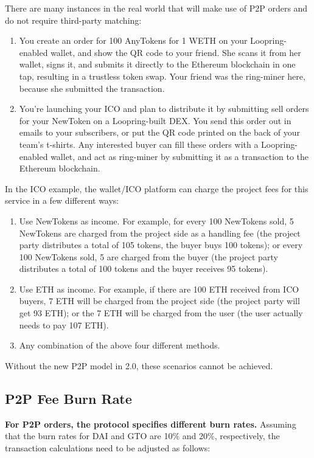 \documentclass[UTF8,nofonts]{article}
\begin{document}
\begin{multicols}{2}
\begin{appendices}
There are many instances in the real world that will make use of P2P orders and do not require third-party matching:

\begin{enumerate}
	\item You create an order for 100 AnyTokens for 1 WETH on your Loopring-enabled wallet, and show the QR code to your friend. She scans it from her wallet, signs it, and submits it directly to the Ethereum blockchain in one tap, resulting in a trustless token swap. Your friend was the ring-miner here, because she submitted the transaction.
	\item You’re launching your ICO and plan to distribute it by submitting sell orders for your NewToken on a Loopring-built DEX. You send this order out in emails to your subscribers, or put the QR code printed on the back of your team’s t-shirts. Any interested buyer can fill these orders with a Loopring-enabled wallet, and act as ring-miner by submitting it as a transaction to the Ethereum blockchain.
\end{enumerate}

In the ICO example, the wallet/ICO platform can charge the project fees for this service in a few different ways: 

\begin{enumerate}
	\item Use NewTokens as income. For example, for every 100 NewTokens sold, 5 NewTokens are charged from the project side as a handling fee (the project party distributes a total of 105 tokens, the buyer buys 100 tokens); or every 100 NewTokens sold, 5 are charged from the buyer (the project party distributes a total of 100 tokens and the buyer receives 95 tokens).
	\item Use ETH as income. For example, if there are 100 ETH received from ICO buyers, 7 ETH will be charged from the project side (the project party will get 93 ETH); or the 7 ETH will be charged from the user (the user actually needs to pay 107 ETH).
	\item Any combination of the above four different methods.
\end{enumerate}

Without the new P2P model in 2.0, these scenarios cannot be achieved.

\subsection{P2P Fee Burn Rate}
\textbf{For P2P orders, the protocol specifies different burn rates.} Assuming that the burn rates for DAI and GTO are 10\% and 20\%, respectively, the transaction calculations need to be adjusted as follows:



\end{appendices}
\end{multicols}
\end{document}
